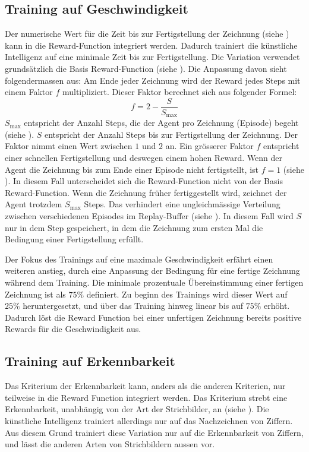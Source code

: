 \subsection{Training auf Geschwindigkeit}\label{sub:m_var_speed}
Der numerische Wert für die Zeit bis zur Fertigstellung der Zeichnung (siehe
) kann in die Reward-Function integriert werden.
Dadurch trainiert die künstliche Intelligenz auf eine minimale Zeit bis zur
Fertigstellung. Die Variation verwendet grundsätzlich die Basis
Reward-Function (siehe ). Die Anpassung davon sieht
folgendermassen aus: Am Ende jeder Zeichnung wird der Reward jedes Steps mit
einem Faktor $f$ multipliziert. Dieser Faktor berechnet sich aus folgender
Formel:
\[ f = 2 - \frac{S}{S_{\max}} \]
$S_{\max}$ entspricht der Anzahl Steps, die der Agent pro Zeichnung (Episode)
begeht (siehe ). $S$ entspricht der Anzahl Steps
bis zur Fertigstellung der Zeichnung. Der Faktor nimmt einen Wert zwischen $1$
und $2$ an. Ein grösserer Faktor $f$ entspricht einer schnellen Fertigstellung
und deswegen einem hohen Reward. Wenn der Agent die Zeichnung bis zum Ende einer
Episode nicht fertigstellt, ist $f = 1$ (siehe ). In
diesem Fall unterscheidet sich die Reward-Function nicht von der Basis
Reward-Function. Wenn die Zeichnung früher fertiggestellt wird, zeichnet der
Agent trotzdem $S_{\max}$ Steps. Das verhindert eine ungleichmässige Verteilung
zwischen verschiedenen Episodes im Replay-Buffer (siehe ).
In diesem Fall wird $S$ nur in dem Step gespeichert, in dem die Zeichnung zum
ersten Mal die Bedingung einer Fertigstellung erfüllt.   

Der Fokus des Trainings auf eine maximale Geschwindigkeit erfährt einen weiteren
anstieg, durch eine Anpassung der Bedingung für eine fertige Zeichnung während
dem Training. Die minimale prozentuale Übereinstimmung einer fertigen Zeichnung
ist als $75\%$ definiert. Zu beginn des Trainings wird dieser Wert auf $25\%$  %
heruntergesetzt, und über das Training hinweg linear bis auf $75\%$ erhöht.
Dadurch löst die Reward Function bei einer unfertigen Zeichnung bereits positive
Rewards für die Geschwindigkeit aus.


\subsection{Training auf Erkennbarkeit}
\label{sub:m_var_rec}
Das Kriterium der Erkennbarkeit kann, anders als die anderen Kriterien, nur
teilweise in die Reward Function integriert werden. Das Kriterium strebt eine
Erkennbarkeit, unabhängig von der Art der Strichbilder, an (siehe
). Die künstliche Intelligenz trainiert allerdings nur
auf das Nachzeichnen von Ziffern. Aus diesem Grund trainiert diese Variation nur
auf die Erkennbarkeit von Ziffern, und lässt die anderen Arten von Strichbildern
aussen vor. 

